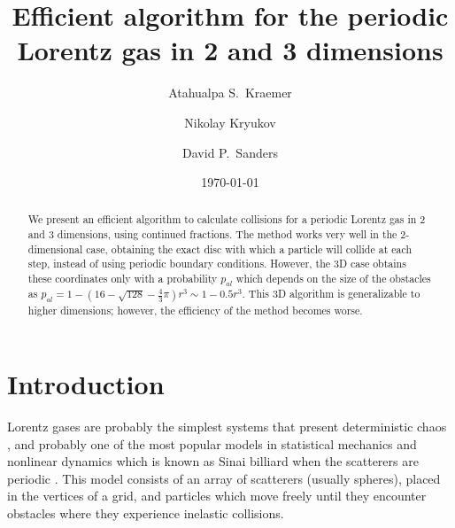 \documentclass[prl,amsmath,amssymb, twocolumn, showpacs]{revtex4-1}
\newcommand{\pp}{p_{al}}
\begin{document}
\title{Efficient algorithm for the periodic Lorentz gas in 2 and 3 dimensions}
\author{Atahualpa S.~Kraemer}

\author{Nikolay Kryukov}

\author{David P.~Sanders}

\date{\today}
\begin{abstract}

We present an efficient algorithm to calculate collisions for a periodic Lorentz gas in 2 and 3 dimensions, using continued fractions. The method works very well in the 2-dimensional case, obtaining the exact disc with which a particle will collide at each step, instead of using periodic boundary conditions. However, the 3D case obtains these coordinates only with a probability $\pp$ which depends on the size of the obstacles as $\pp= 1-(16-\sqrt{128}-\frac{4}{3} \pi) r^3 \sim 1-0.5 r^3$. This 3D algorithm is generalizable to higher dimensions; however, the efficiency of the method becomes worse. 
\end{abstract}

\maketitle

\section{Introduction}



Lorentz gases are probably the simplest systems that present deterministic chaos \cite{cvitanovic1992investigation}, and probably one of the most popular models in statistical mechanics and nonlinear dynamics which is known as Sinai billiard when the scatterers are periodic \cite{bunimovich1981statistical}. This model consists of an array of scatterers (usually spheres), placed in the vertices of a grid, and particles which move freely until they encounter obstacles where they experience inelastic collisions. 
\end{document}
